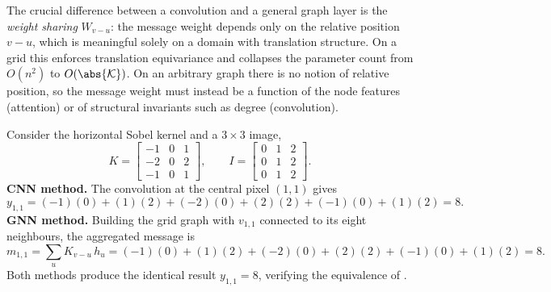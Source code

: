 The crucial difference between a convolution and a general graph layer is the
\emph{weight sharing} $W_{v-u}$: the message weight depends only on the relative
position $v-u$, which is meaningful solely on a domain with translation
structure. On a grid this enforces translation equivariance and collapses the
parameter count from $O(n^2)$ to $O(\abs{\mathcal{K}})$. On an arbitrary graph
there is no notion of relative position, so the message weight must instead be a
function of the node features (attention) or of structural invariants such as
degree (convolution).

\begin{example}
\label{ex:graphs:sobel}
Consider the horizontal Sobel kernel and a $3 \times 3$ image,
\[
  K = \begin{bmatrix} -1 & 0 & 1 \\ -2 & 0 & 2 \\ -1 & 0 & 1 \end{bmatrix},
  \qquad
  I = \begin{bmatrix} 0 & 1 & 2 \\ 0 & 1 & 2 \\ 0 & 1 & 2 \end{bmatrix}.
\]
\textbf{CNN method.} The convolution at the central pixel $(1,1)$ gives
\[
  y_{1,1} = (-1)(0) + (1)(2) + (-2)(0) + (2)(2) + (-1)(0) + (1)(2) = 8 .
\]
\textbf{GNN method.} Building the grid graph with $v_{1,1}$ connected to its
eight neighbours, the aggregated message is
\[
  m_{1,1} = \sum_{u} K_{v-u}\, h_u
    = (-1)(0) + (1)(2) + (-2)(0) + (2)(2) + (-1)(0) + (1)(2) = 8 .
\]
Both methods produce the identical result $y_{1,1} = 8$, verifying the
equivalence of .
\end{example}

